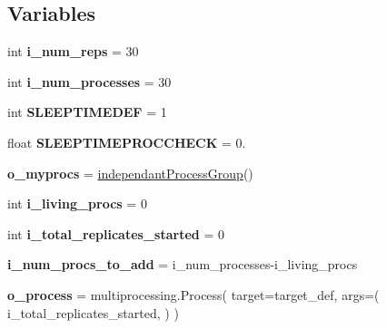 \subsection*{Variables}
\begin{DoxyCompactItemize}
\item 
int {\bfseries i\+\_\+num\+\_\+reps} = 30\hypertarget{namespacenegui_1_1pgutilityclasses_a6d2d70d52051a29270b18744b0d61b6f}{}\label{namespacenegui_1_1pgutilityclasses_a6d2d70d52051a29270b18744b0d61b6f}

\item 
int {\bfseries i\+\_\+num\+\_\+processes} = 30\hypertarget{namespacenegui_1_1pgutilityclasses_a452e546024d102578ea5f612b0b5145e}{}\label{namespacenegui_1_1pgutilityclasses_a452e546024d102578ea5f612b0b5145e}

\item 
int {\bfseries S\+L\+E\+E\+P\+T\+I\+M\+E\+D\+EF} = 1\hypertarget{namespacenegui_1_1pgutilityclasses_a4a6b4f9741e5388606d96d04e76649a3}{}\label{namespacenegui_1_1pgutilityclasses_a4a6b4f9741e5388606d96d04e76649a3}

\item 
float {\bfseries S\+L\+E\+E\+P\+T\+I\+M\+E\+P\+R\+O\+C\+C\+H\+E\+CK} = 0.\hypertarget{namespacenegui_1_1pgutilityclasses_a7dfa391fbaf39495babed1f63ed443a2}{}\label{namespacenegui_1_1pgutilityclasses_a7dfa391fbaf39495babed1f63ed443a2}

\item 
{\bfseries o\+\_\+myprocs} = \hyperlink{classnegui_1_1pgutilityclasses_1_1independantProcessGroup}{independant\+Process\+Group}()\hypertarget{namespacenegui_1_1pgutilityclasses_a91aaf8fb92c7b0cb26169762d52b3fa9}{}\label{namespacenegui_1_1pgutilityclasses_a91aaf8fb92c7b0cb26169762d52b3fa9}

\item 
int {\bfseries i\+\_\+living\+\_\+procs} = 0\hypertarget{namespacenegui_1_1pgutilityclasses_ab30ac90a84fd0d02be89466f8107eac0}{}\label{namespacenegui_1_1pgutilityclasses_ab30ac90a84fd0d02be89466f8107eac0}

\item 
int {\bfseries i\+\_\+total\+\_\+replicates\+\_\+started} = 0\hypertarget{namespacenegui_1_1pgutilityclasses_a863a46e903eb418585b418098524aa7e}{}\label{namespacenegui_1_1pgutilityclasses_a863a46e903eb418585b418098524aa7e}

\item 
{\bfseries i\+\_\+num\+\_\+procs\+\_\+to\+\_\+add} = i\+\_\+num\+\_\+processes-\/i\+\_\+living\+\_\+procs\hypertarget{namespacenegui_1_1pgutilityclasses_aeb4bf74959b277dce2756ce7bed39b82}{}\label{namespacenegui_1_1pgutilityclasses_aeb4bf74959b277dce2756ce7bed39b82}

\item 
{\bfseries o\+\_\+process} = multiprocessing.\+Process( target=target\+\_\+def, args=( i\+\_\+total\+\_\+replicates\+\_\+started, ) )\hypertarget{namespacenegui_1_1pgutilityclasses_a9bd6fae591c5af2bc61e3fa9e29114ef}{}\label{namespacenegui_1_1pgutilityclasses_a9bd6fae591c5af2bc61e3fa9e29114ef}

\end{DoxyCompactItemize}


